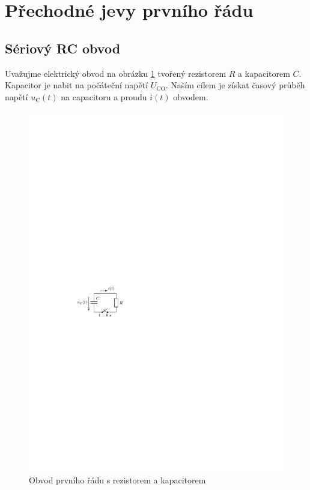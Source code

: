 \section{Přechodné jevy prvního řádu}

\subsection{Sériový RC obvod}

Uvažujme elektrický obvod na obrázku \ref{fig:prvni_rad_rc} tvořený rezistorem $R$ a kapacitorem $C$. Kapacitor je nabit na počáteční  napětí $U_\mathrm{CO}$. Naším cílem je získat časový průběh napětí $u_\mathrm{C}(t)$ na capacitoru a proudu $i(t)$ obvodem.
\begin{figure}[h!]
\centering
\includegraphics[]{prechodne_jevy/prvni_rad/rc.pdf}
\caption{Obvod prvního řádu s rezistorem a kapacitorem}
\label{fig:prvni_rad_rc}
\end{figure}
